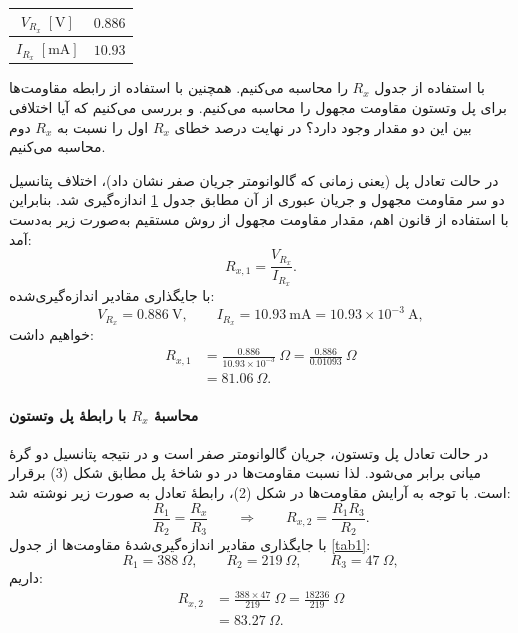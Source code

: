 \documentclass[a4paper, 11pt]{article}
\begin{document}
\begin{table}[h!]
\caption{}
\label{tab4}
\centering
\begin{tabular}{cc}
\hline
$V_{R_x} \;[\mathrm{V}]$ & $0.886$ \\
\hline
$I_{R_x} \;[\mathrm{mA}]$ & $10.93$ \\
\hline
\end{tabular}
\end{table}

با استفاده از جدول $R_x$ را محاسبه می‌کنیم. همچنین با استفاده از رابطه مقاومت‌ها برای پل وتستون مقاومت مجهول را محاسبه می‌کنیم. و بررسی می‌کنیم که آیا اختلافی بین این دو مقدار وجود دارد؟ در نهایت درصد خطای $R_x$ اول را نسبت به $R_x$ دوم محاسبه می‌کنیم.

در حالت تعادل پل (یعنی زمانی که گالوانومتر جریان صفر نشان داد)، اختلاف پتانسیل دو سر مقاومت مجهول و جریان عبوری از آن مطابق جدول \ref{tab4} اندازه‌گیری شد. بنابراین با استفاده از قانون اهم، مقدار مقاومت مجهول از روش مستقیم به‌صورت زیر به‌دست آمد:
\begin{equation}
R_{x,1}=\frac{V_{R_x}}{I_{R_x}}.
\end{equation}
با جایگذاری مقادیر اندازه‌گیری‌شده:
\[
V_{R_x}=0.886~\mathrm{V}, \qquad I_{R_x}=10.93~\mathrm{mA}=10.93\times 10^{-3}~\mathrm{A},
\]
خواهیم داشت:
\begin{align}
R_{x,1}
&=\frac{0.886}{10.93\times 10^{-3}}~\Omega
=\frac{0.886}{0.01093}~\Omega \nonumber\\
&= 81.06~\Omega.
\end{align}

\paragraph{محاسبهٔ \texorpdfstring{$R_x$}{Rx} با رابطهٔ پل وتستون}

در حالت تعادل پل وتستون، جریان گالوانومتر صفر است و در نتیجه پتانسیل دو گرهٔ میانی برابر می‌شود. لذا نسبت مقاومت‌ها در دو شاخهٔ پل مطابق شکل (3) برقرار است. با توجه به آرایش مقاومت‌ها در شکل (2)، رابطهٔ تعادل به صورت زیر نوشته شد:
\begin{equation}
\frac{R_1}{R_2}=\frac{R_x}{R_3}
\qquad \Longrightarrow \qquad
R_{x,2}=\frac{R_1R_3}{R_2}.
\end{equation}
با جایگذاری مقادیر اندازه‌گیری‌شدهٔ مقاومت‌ها از جدول \ref{tab1}:
\[
R_1=388~\Omega,\qquad R_2=219~\Omega,\qquad R_3=47~\Omega,
\]
داریم:
\begin{align}
R_{x,2}
&=\frac{388\times 47}{219}~\Omega
=\frac{18236}{219}~\Omega \nonumber\\
&=83.27~\Omega.
\end{align}
\end{document}
